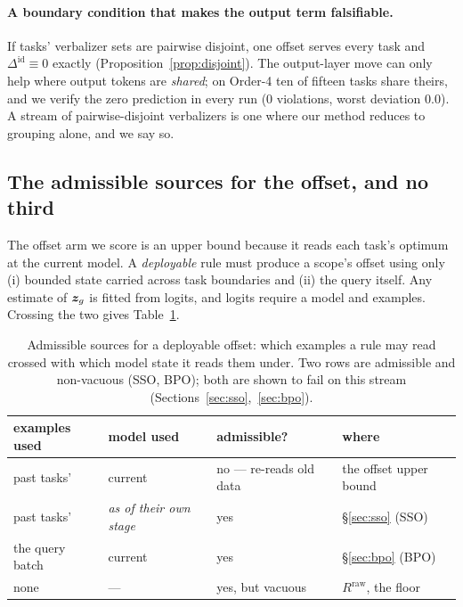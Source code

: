 \paragraph{A boundary condition that makes the output term falsifiable.}
If tasks' verbalizer sets are pairwise disjoint, one offset serves every task and
$\Delta^{\mathrm{id}}\equiv0$ exactly (Proposition~\ref{prop:disjoint}). The
output-layer move can only help where output tokens are \emph{shared}; on Order-4
ten of fifteen tasks share theirs, and we verify the zero prediction in every run
($0$ violations, worst deviation $0.0$). A stream of pairwise-disjoint verbalizers
is one where our method reduces to grouping alone, and we say so.

\subsection{The admissible sources for the offset, and no third}
\label{sec:enumeration}

The offset arm we score is an upper bound because it reads each task's optimum at
the current model. A \emph{deployable} rule must produce a scope's offset using
only (i) bounded state carried across task boundaries and (ii) the query itself.
Any estimate of $\bm{z}_g$ is fitted from logits, and logits require a model and
examples. Crossing the two gives Table~\ref{tab:admissible}.

\begin{table}[t]
\centering
\small
\caption{Admissible sources for a deployable offset: which examples a rule may read
crossed with which model state it reads them under. Two rows are admissible and
non-vacuous (SSO, BPO); both are shown to fail on this stream
(Sections~\ref{sec:sso},~\ref{sec:bpo}).}
\label{tab:admissible}
\begin{tabular}{llll}
\toprule
examples used & model used & admissible? & where \\
\midrule
past tasks' & current & no --- re-reads old data & the offset upper bound \\
past tasks' & \emph{as of their own stage} & yes & \S\ref{sec:sso} (SSO) \\
the query batch & current & yes & \S\ref{sec:bpo} (BPO) \\
none & --- & yes, but vacuous & $R^{\mathrm{raw}}$, the floor \\
\bottomrule
\end{tabular}
\end{table}

